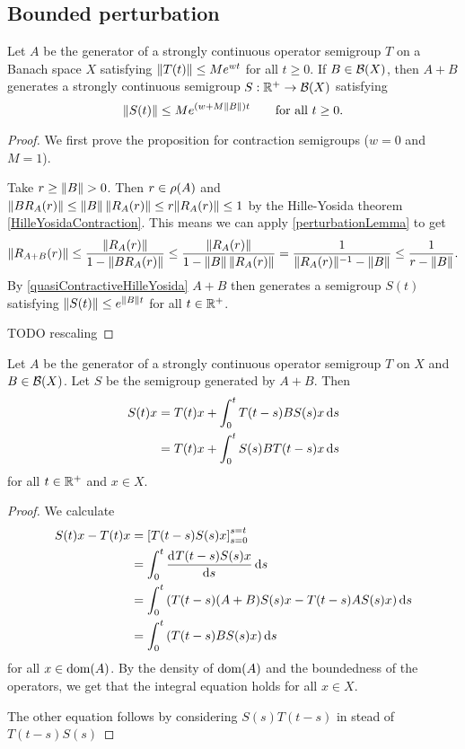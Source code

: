 \subsection{Bounded perturbation}
\begin{proposition}
Let $A$ be the generator of a strongly continuous operator semigroup $T$ on a Banach space $X$ satisfying $\lVert T(t)\rVert\leq Me^{wt}$ for all $t\geq 0$. If $B\in \operatorname{\mathcal{B}}(X)$, then $A+B$ generates a strongly continuous semigroup $S: \mathbb{R}^+\to \operatorname{\mathcal{B}}(X)$ satisfying
\[ \lVert S(t)\rVert \leq Me^{(w+M\lVert B\rVert)t} \qquad \text{for all $t\geq 0$.} \]
\end{proposition}
\begin{proof}
We first prove the proposition for contraction semigroups ($w=0$ and $M = 1$).

Take $r \geq \lVert B\rVert > 0$. Then $r\in\rho(A)$ and $\lVert BR_A(r)\rVert \leq \lVert B\rVert\,\lVert R_A(r)\rVert \leq r \lVert R_A(r)\rVert \leq 1$ by the Hille-Yosida theorem \ref{HilleYosidaContraction}. This means we can apply \ref{perturbationLemma} to get
\[ \lVert R_{A+B}(r)\rVert \leq \frac{\lVert R_A(r)\rVert}{1- \lVert BR_A(r)\rVert} \leq \frac{\lVert R_A(r)\rVert}{1- \lVert B\rVert\,\lVert R_A(r)\rVert} = \frac{1}{\lVert R_A(r)\rVert^{-1} - \lVert B\rVert} \leq \frac{1}{r - \lVert B\rVert}. \]
By \ref{quasiContractiveHilleYosida} $A+B$ then generates a semigroup $S(t)$ satisfying $\lVert S(t)\rVert \leq e^{\lVert B\rVert t}$ for all $t\in\mathbb{R}^+$.

TODO rescaling
\end{proof}
\begin{corollary} \label{operatorVariationOfParameteres}
Let $A$ be the generator of a strongly continuous operator semigroup $T$ on $X$ and $B\in\operatorname{\mathcal{B}}(X)$. Let $S$ be the semigroup generated by $A+B$. Then
\begin{align*}
S(t)x &= T(t)x + \int_0^tT(t-s)BS(s)x\operatorname{d \!}{s} \\
&= T(t)x + \int_0^tS(s)BT(t-s)x\operatorname{d \!}{s}
\end{align*}
for all $t\in\mathbb{R}^+$ and $x\in X$.
\end{corollary}
\begin{proof}
We calculate
\begin{align*}
S(t)x - T(t)x &= \left[ T(t-s)S(s)x \right]_{s=0}^{s=t} \\
&= \int_0^t \mathinner{ \dfrac{\operatorname{d \!}{^{}}T(t-s)S(s)x}{\operatorname{d \!}{{s}^{}}} }\operatorname{d \!}{s} \\
&= \int_0^t \left( T(t-s)(A+B)S(s)x - T(t-s)AS(s)x \right)\operatorname{d \!}{s} \\
&= \int_0^t \left( T(t-s)BS(s)x \right)\operatorname{d \!}{s}
\end{align*}
for all $x\in \operatorname{dom}(A)$. By the density of $\operatorname{dom}(A)$ and the boundedness of the operators, we get that the integral equation holds for all $x\in X$.

The other equation follows by considering $S(s)T(t-s)$ in stead of $T(t-s)S(s)$
\end{proof}

